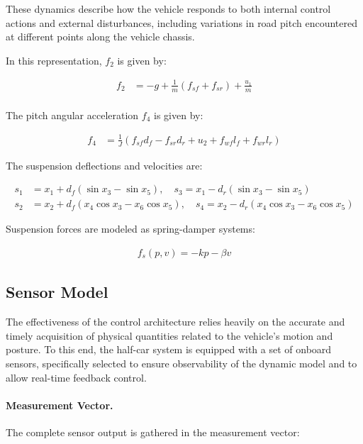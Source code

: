 \documentclass[]{report}
\begin{document}
These dynamics describe how the vehicle responds to both internal control actions and external disturbances, including variations in road pitch encountered at different points along the vehicle chassis.

In this representation, $f_2$ is given by:

\begin{align}
	f_2 &= -g + \frac{1}{m}(f_{sf} + f_{sr}) + \frac{u_1}{m} \\
\end{align}

The pitch angular acceleration $f_4$ is given by:

\begin{align}	
	f_4 &= \frac{1}{J}(f_{sf} d_f - f_{sr} d_r + u_2 + f_{wf} l_{f} + f_{wr} l_{r})
\end{align}


The suspension deflections and velocities are:

\begin{align}
	s_1 &= x_1 + d_f(\sin x_3 - \sin x_5), \quad s_3 = x_1 - d_r(\sin x_3 - \sin x_5) \\
	s_2 &= x_2 + d_f(x_4 \cos x_3 - x_6 \cos x_5), \quad s_4 = x_2 - d_r(x_4 \cos x_3 - x_6 \cos x_5)
\end{align}

Suspension forces are modeled as spring-damper systems:

\begin{align}
	f_s(p, v) = -k p - \beta v
\end{align}

\subsection{Sensor Model}

The effectiveness of the control architecture relies heavily on the accurate and timely acquisition of physical quantities related to the vehicle's motion and posture. To this end, the half-car system is equipped with a set of onboard sensors, specifically selected to ensure observability of the dynamic model and to allow real-time feedback control.

\paragraph{Measurement Vector.}
The complete sensor output is gathered in the measurement vector:
\end{document}
